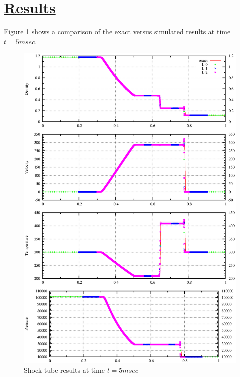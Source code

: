 \documentclass[fleqn]{article}
\begin{document}
\section*{\underline{Results}}
Figure \ref{results} shows a comparison of the exact versus simulated results at time $t = 5msec$.
\begin{figure}
\includegraphics[scale=.85]{figures/shockTube_AMR.ps}
\caption{Shock tube results at time $t = 5msec$}
\label{results}
\end{figure}
\newpage




\end{document}
